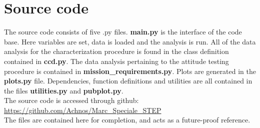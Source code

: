 \documentclass[../main.tex]{subfiles}
\begin{document}
\clearpage
\chapter{Source code}

The source code consists of five .py files. \textbf{main.py} is the interface of the code base. Here variables are set, data is loaded and the analysis is run. All of the data analysis for the characterization procedure is found in the class definition contained in \textbf{ccd.py}. The data analysis pertaining to the attitude testing procedure is contained in \textbf{mission\_requirements.py}. Plots are generated in the \textbf{plots.py} file. Dependencies, function definitions and utilities are all contained in the files \textbf{utilities.py} and \textbf{pubplot.py}.\\ 

The source code is accessed through github: \url{https://github.com/Achnos/Marc_Speciale_STEP}\\
The files are contained here for completion, and acts as a future-proof reference.
\end{document}

